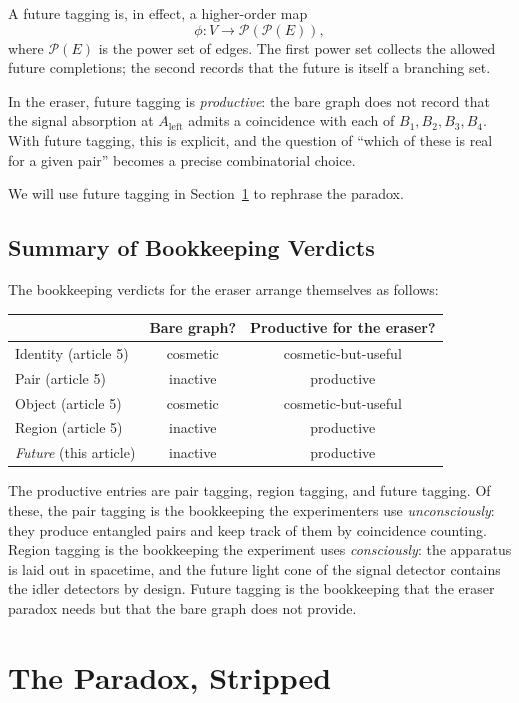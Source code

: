 \documentclass[11pt]{article}
\begin{document}
A future tagging is, in effect, a higher-order map
\[
\phi : V \to \mathcal{P}(\mathcal{P}(E)),
\]
where $\mathcal{P}(E)$ is the power set of edges. The first power set collects the allowed future completions; the second records that the future is itself a branching set.

In the eraser, future tagging is \emph{productive}: the bare graph does not record that the signal absorption at $A_{\text{left}}$ admits a coincidence with each of $B_1, B_2, B_3, B_4$. With future tagging, this is explicit, and the question of ``which of these is real for a given pair'' becomes a precise combinatorial choice.

We will use future tagging in Section~\ref{sec:paradox-stripped} to rephrase the paradox.

\subsection{Summary of Bookkeeping Verdicts}

The bookkeeping verdicts for the eraser arrange themselves as follows:
\begin{center}
\begin{tabular}{lcc}
                              & \textbf{Bare graph?} & \textbf{Productive for the eraser?} \\ \hline
Identity (article 5)          & cosmetic & cosmetic-but-useful \\
Pair (article 5)              & inactive & productive \\
Object (article 5)            & cosmetic & cosmetic-but-useful \\
Region (article 5)            & inactive & productive \\
\textit{Future} (this article) & inactive & productive
\end{tabular}
\end{center}
The productive entries are pair tagging, region tagging, and future tagging. Of these, the pair tagging is the bookkeeping the experimenters use \emph{unconsciously}: they produce entangled pairs and keep track of them by coincidence counting. Region tagging is the bookkeeping the experiment uses \emph{consciously}: the apparatus is laid out in spacetime, and the future light cone of the signal detector contains the idler detectors by design. Future tagging is the bookkeeping that the eraser paradox needs but that the bare graph does not provide.

\section{The Paradox, Stripped}
\label{sec:paradox-stripped}
\end{document}
